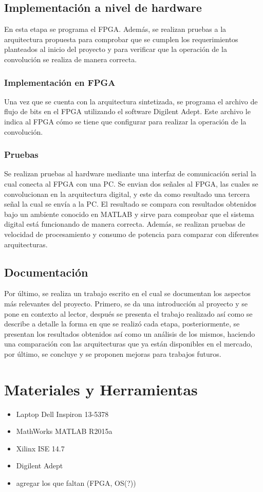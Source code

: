 \subsection{Implementación a nivel de hardware}
En esta etapa se programa el FPGA. Además, se realizan pruebas a la arquitectura propuesta para comprobar que se cumplen los requerimientos planteados al inicio del proyecto y para verificar que la operación de la convolución se realiza de manera correcta. 

\subsubsection{Implementación en FPGA}
Una vez que se cuenta con la arquitectura sintetizada, se programa el archivo de flujo de bits en el FPGA utilizando el software Digilent Adept. Este archivo le indica al FPGA cómo se tiene que configurar para realizar la operación de la convolución.

\subsubsection{Pruebas}
Se realizan pruebas al hardware mediante una interfaz de comunicación serial la cual conecta al FPGA con una PC. Se envian dos señales al FPGA, las cuales se convolucionan en la arquitectura digital, y este da como resultado una tercera señal la cual se envía a la PC. El resultado se compara con resultados obtenidos bajo un ambiente conocido en MATLAB y sirve para comprobar que el sistema digital está funcionando de manera correcta. Además, se realizan pruebas de velocidad de procesamiento y consumo de potencia para comparar con diferentes arquitecturas.

\subsection{Documentación}
Por último, se realiza un trabajo escrito en el cual se documentan los aspectos más relevantes del proyecto. Primero, se da una introducción al proyecto y se pone en contexto al lector, después se presenta el trabajo realizado así como se describe a detalle la forma en que se realizó cada etapa, posteriormente, se presentan los resultados obtenidos así como un análisis de los mismos, haciendo una comparación con las arquitecturas que ya están disponibles en el mercado, por último, se concluye y se proponen mejoras para trabajos futuros. 

\section{Materiales y Herramientas}
\begin{itemize}
\item Laptop Dell Inspiron 13-5378
\item MathWorks MATLAB R2015a
\item Xilinx ISE 14.7
\item Digilent Adept
\color{red}
\item agregar los que faltan (FPGA, OS(?))
\end{itemize}

